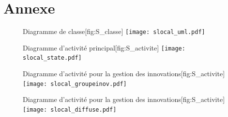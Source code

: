 \section{Annexe}
\label{sec:annexe}

\begin{figure}[!htbp]
\begin{sidecaption}[fortoc]{Diagramme de classe}[fig:S_classe]
  \centering
 \texttt{[image: slocal\_uml.pdf]}
  \end{sidecaption}
\end{figure}

\begin{figure}[!htbp]
\begin{sidecaption}[fortoc]{Diagramme d'activité principal}[fig:S_activite]
  \centering
 \texttt{[image: slocal\_state.pdf]}
  \end{sidecaption}
\end{figure}

\begin{figure}[!htbp]
\begin{sidecaption}[fortoc]{Diagramme d'activité pour la gestion des innovations}[fig:S_activite]
  \centering
 \texttt{[image: slocal\_groupeinov.pdf]}
  \end{sidecaption}
\end{figure}

\begin{figure}[!htbp]
\begin{sidecaption}[fortoc]{Diagramme d'activité pour la gestion des innovations}[fig:S_activite]
  \centering
 \texttt{[image: slocal\_diffuse.pdf]}
  \end{sidecaption}
\end{figure}

\printbibliography[heading=subbibliography]


